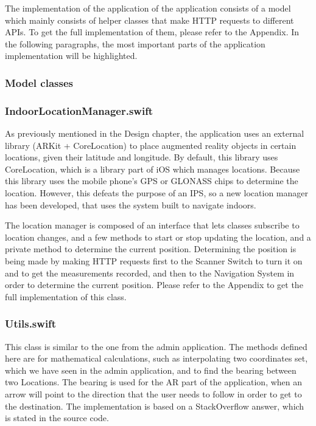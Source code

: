 The implementation of the application of the application consists of a model which mainly consists of helper classes that make HTTP requests to different APIs. To get the full implementation of them, please refer to the Appendix. In the following paragraphs, the most important parts of the application implementation will be highlighted.

\subsubsection{Model classes}
\subsubsection*{IndoorLocationManager.swift}
As previously mentioned in the Design chapter, the application uses an external library (ARKit + CoreLocation) to place augmented reality objects in certain locations, given their latitude and longitude. By default, this library uses CoreLocation, which is a library part of iOS which manages locations. Because this library uses the mobile phone's GPS or GLONASS chips to determine the location. However, this defeats the purpose of an IPS, so a new location manager has been developed, that uses the system built to navigate indoors. 

The location manager is composed of an interface that lets classes subscribe to location changes, and a few methods to start or stop updating the location, and a private method to determine the current position. Determining the position is being made by making HTTP requests first to the Scanner Switch to turn it on and to get the measurements recorded, and then to the Navigation System in order to determine the current position. Please refer to the Appendix to get the full implementation of this class.

\subsubsection*{Utils.swift}
This class is similar to the one from the admin application. The methods defined here are for mathematical calculations, such as interpolating two coordinates set, which we have seen in the admin application, and to find the bearing between two Locations. The bearing is used for the AR part of the application, when an arrow will point to the direction that the user needs to follow in order to get to the destination. The implementation is based on a StackOverflow answer, which is stated in the source code.

